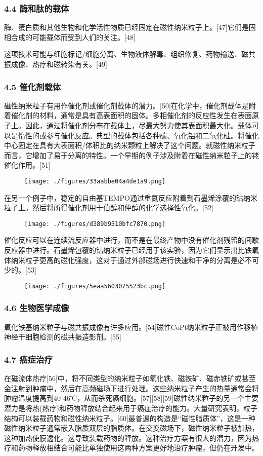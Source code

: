 \subsubsection{4.4 酶和肽的载体}
酶、蛋白质和其他生物和化学活性物质已经固定在磁性纳米粒子上。[47]它们是固相合成的可能载体而受到人们的关注。[48]

这项技术可能与细胞标记/细胞分离、生物液体解毒、组织修复、药物输送、磁共振成像、热疗和磁转染有关。[49]

\subsubsection{4.5 催化剂载体}
磁性纳米粒子有用作催化剂或催化剂载体的潜力。[50]在化学中，催化剂载体是附着催化剂的材料，通常是具有高表面积的固体。多相催化剂的反应性发生在表面原子上。因此，通过将催化剂分布在载体上，尽最大努力使其表面积最大化。载体可以是惰性的或参与催化反应。典型的载体包括各种碳、氧化铝和二氧化硅。将催化中心固定在具有大表面积/体积比的纳米颗粒上解决了这个问题。就磁性纳米粒子而言，它增加了易于分离的特性。一个早期的例子涉及附着在磁性纳米粒子上的铑催化作用。[51]
\begin{figure}[ht]
\centering
\texttt{[image: ./figures/33aabbe04a4de1a9.png]}
\caption\label{fig_CXNMLZ_5}
\end{figure}
在另一个例子中，稳定的自由基TEMPO通过重氮反应附着到石墨烯涂覆的钴纳米粒子上。然后将所得催化剂用于伯醇和仲醇的化学选择性氧化。[52]
\begin{figure}[ht]
\centering
\texttt{[image: ./figures/d389b9510bfc7870.png]}
\caption\label{fig_CXNMLZ_6}
\end{figure}
催化反应可以在连续流反应器中进行，而不是在最终产物中没有催化剂残留的间歇反应器中进行。石墨烯包覆的钴纳米粒子已经用于该实验，因为它们显示出比铁氧体纳米粒子更高的磁化强度，这对于通过外部磁场进行快速和干净的分离是必不可少的。[53]
\begin{figure}[ht]
\centering
\texttt{[image: ./figures/5eaa5603075523bc.png]}
\caption\label{fig_CXNMLZ_7}
\end{figure}

\subsubsection{4.6 生物医学成像}
氧化铁基纳米粒子与磁共振成像有许多应用。[54]磁性CoPt纳米粒子正被用作移植神经干细胞检测的磁共振造影剂。[55]

\subsubsection{4.7 癌症治疗}
在磁流体热疗[56]中，将不同类型的纳米粒子如氧化铁、磁铁矿、磁赤铁矿或甚至金注射到肿瘤中，然后在高频磁场下进行处理。这些纳米粒子产生的热量通常会将肿瘤温度提高到40-46℃，从而杀死癌细胞。[57][58][59]磁性纳米粒子的另一个主要潜力是将热(热疗)和药物释放结合起来用于癌症治疗的能力。大量研究表明，粒子结构可以装载药物和磁性纳米粒子。[60]最普遍的构造是“磁性脂质体”，这是一种磁性纳米粒子通常嵌入脂质双层的脂质体。在交变磁场下，磁性纳米粒子被加热，这种加热使膜透化。这导致装载药物的释放。这种治疗方案有很大的潜力，因为热疗和药物释放相结合可能比单独使用这两种方案更好地治疗肿瘤，但仍在开发中。

